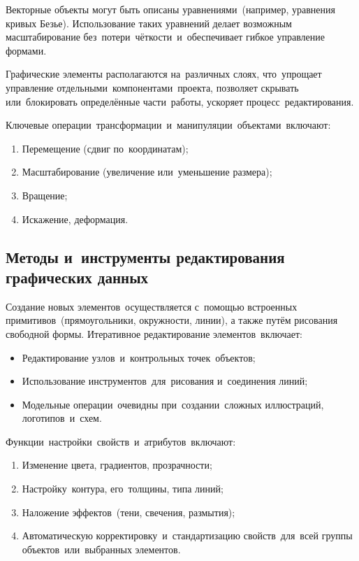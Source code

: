 \documentclass{ou}
\begin{document}
Векторные объекты могут быть описаны уравнениями~(например, уравнения кривых Безье). Использование таких уравнений делает возможным масштабирование без~потери~чёткости~и~обеспечивает гибкое управление формами.

Графические элементы располагаются на~различных слоях, что~упрощает управление отдельными~компонентами~проекта, позволяет скрывать или~блокировать определённые части~работы, ускоряет процесс~редактирования.

Ключевые операции~трансформации~и~манипуляции~объектами~включают:
\begin{enumerate}[itemindent=2em, nosep, label=\arabic*)]
  \item Перемещение (сдвиг по~координатам);
  \item Масштабирование (увеличение или~уменьшение размера);
  \item Вращение;
  \item Искажение, деформация.
\end{enumerate}
\subsection{Методы и~инструменты редактирования графических данных}
Создание новых элементов~осуществляется с~помощью встроенных примитивов~(прямоугольники, окружности, линии), а также путём рисования свободной формы. Итеративное редактирование элементов~включает:
\begin{itemize}[label=-, itemindent=2em, nosep]
  \item Редактирование узлов~и~контрольных точек~объектов;
  \item Использование инструментов~для~рисования и~соединения линий;
  \item Модельные операции~очевидны при~создании~сложных иллюстраций, логотипов~и~схем.
\end{itemize}

Функции~настройки~свойств~и~атрибутов~включают:
\begin{enumerate}[itemindent=2em, nosep, label=\arabic*)]
  \item Изменение цвета, градиентов, прозрачности;
  \item Настройку~контура, его~толщины, типа линий;
  \item Наложение эффектов~(тени, свечения, размытия);
  \item Автоматическую корректировку~и~стандартизацию свойств~для~всей группы объектов~или~выбранных элементов.
\end{enumerate}
\end{document}
